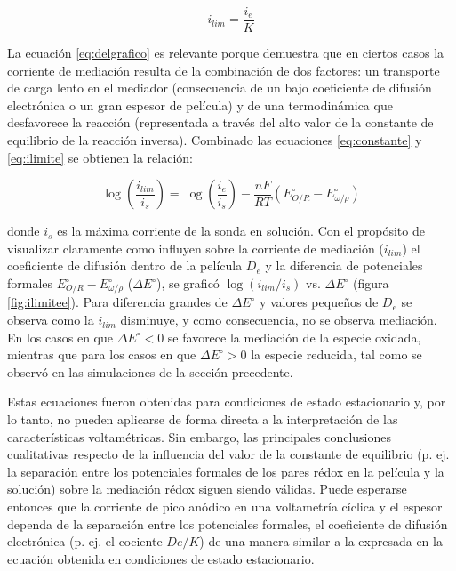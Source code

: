 		\begin{equation}
		i_{lim}=\frac{i_e}{K}
		\label{eq:ilimite}
		\end{equation}

		La ecuación \ref{eq:delgrafico} es relevante porque demuestra que en ciertos casos la corriente de mediación resulta de la combinación de dos factores: un transporte de carga lento en el mediador (consecuencia de un bajo coeficiente de difusión electrónica o un gran espesor de película) y de una termodinámica que desfavorece la reacción (representada a través del alto valor de la constante de equilibrio de la reacción inversa).\cite{ybarra2005}
		Combinado las ecuaciones \ref{eq:constante} y \ref{eq:ilimite} se obtienen la relación:

		\begin{equation}
			\log\left({\frac{i_{lim}}{i_s}}\right) =\log\left({\frac{i_e}{i_s}}\right)-{\frac{nF}{RT}}\left( E^{\circ}_{O/R} - E^{\circ}_{\omega / \rho} \right)
			\label{eq:delgrafico}
		\end{equation}

		\noindent donde $i_s$ es la máxima corriente de la sonda en solución. Con el propósito de visualizar claramente como influyen sobre la corriente de mediación ($i_{lim}$) el coeficiente de difusión dentro de la película $D_e$ y la diferencia de potenciales formales $E^{\circ}_{O/R} - E^{\circ}_{\omega / \rho}$ ($\Delta E^{\circ}$), se graficó $\log(i_{lim}/i_{s})$ vs. $\Delta E^{\circ}$ (figura \ref{fig:ilimitee}). Para diferencia grandes de $\Delta E^{\circ}$ y valores pequeños de $D_e$  se observa como la $i_{lim}$ disminuye, y como consecuencia, no se observa mediación. En los casos en que $\Delta E^{\circ}<0$ se favorece la mediación de la especie oxidada, mientras que para los casos en que $\Delta E^{\circ}>0$ la especie reducida, tal como se observó en las simulaciones de la sección precedente.\cite{ybarraaaa2007}

		Estas ecuaciones fueron obtenidas para condiciones de estado estacionario y, por lo tanto, no pueden aplicarse de forma directa a la interpretación de las características voltamétricas. Sin embargo, las principales conclusiones cualitativas respecto de la influencia del valor de la constante de equilibrio (p. ej. la separación entre los potenciales formales de los pares rédox en la película y la solución) sobre la mediación rédox siguen siendo válidas. Puede esperarse entonces que la corriente de pico anódico en una voltametría cíclica y el espesor dependa de la separación entre los potenciales formales, el coeficiente de difusión electrónica (p. ej. el cociente $De/K$) de una manera similar a la expresada en la ecuación obtenida en condiciones de estado estacionario. 
		
